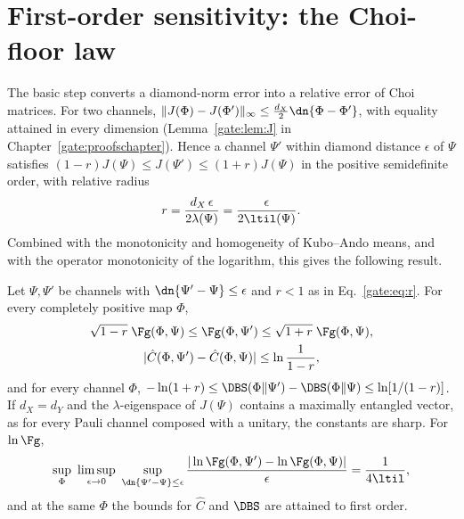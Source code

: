 \section{First-order sensitivity: the Choi-floor law}\label{gate:sec:laws}

The basic step converts a diamond-norm error into a relative error of Choi matrices. For two channels, $\|J(\Phi)-J(\Phi')\|_\infty\le\frac{d_X}{2}\dn{\Phi-\Phi'}$, with equality attained in every dimension (Lemma~\ref{gate:lem:J} in Chapter~\ref{gate:proofschapter}). Hence a channel $\Psi'$ within diamond distance $\epsilon$ of $\Psi$ satisfies $(1-r)J(\Psi)\le J(\Psi')\le(1+r)J(\Psi)$ in the positive semidefinite order, with relative radius
\begin{equation}\label{gate:eq:r}
r=\frac{d_X\,\epsilon}{2\lambda(\Psi)}=\frac{\epsilon}{2\ltil(\Psi)} .
\end{equation}
Combined with the monotonicity and homogeneity of Kubo--Ando means, and with the operator monotonicity of the logarithm, this gives the following result.

\begin{theorem}\label{gate:thm:floor}
Let $\Psi,\Psi'$ be channels with $\dn{\Psi'-\Psi}\le\epsilon$ and $r<1$ as in Eq.~\eqref{gate:eq:r}. For every completely positive map $\Phi$,
\begin{gather}
\sqrt{1-r}\;\Fg(\Phi,\Psi)\le\Fg(\Phi,\Psi')\le\sqrt{1+r}\;\Fg(\Phi,\Psi),\label{gate:eq:floor}\\
|\hat C(\Phi,\Psi')-\hat C(\Phi,\Psi)|\le\ln\frac1{1-r},\nonumber
\end{gather}
and for every channel $\Phi$, $-\ln(1+r)\le\DBS(\Phi\|\Psi')-\DBS(\Phi\|\Psi)\le\ln[1/(1-r)]$. If $d_X=d_Y$ and the $\lambda$-eigenspace of $J(\Psi)$ contains a maximally entangled vector, as for every Pauli channel composed with a unitary, the constants are sharp. For $\ln\Fg$,
\begin{equation}\label{gate:eq:sharp}
\sup_\Phi\ \limsup_{\epsilon\to0}\ \sup_{\dn{\Psi'-\Psi}\le\epsilon}\frac{|\ln\Fg(\Phi,\Psi')-\ln\Fg(\Phi,\Psi)|}{\epsilon}=\frac{1}{4\ltil},
\end{equation}
and at the same $\Phi$ the bounds for $\hat C$ and $\DBS$ are attained to first order.
\end{theorem}

